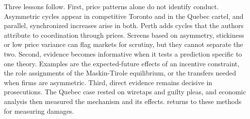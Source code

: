 Three lessons follow. First, price patterns alone do not identify conduct. Asymmetric cycles appear in competitive Toronto and in the
Quebec cartel, and parallel, synchronized increases arise in both. Perth adds cycles that the authors attribute to coordination through prices. Screens based on asymmetry, stickiness or low price variance
\citep{AbrantesMetzEtAl2006} can flag markets for scrutiny, but they cannot separate the two. Second, evidence becomes informative when
it tests a prediction specific to one theory. Examples are the expected-future effects of an incentive constraint, the role
assignments of the Maskin-Tirole equilibrium, or the transfers needed when firms are asymmetric. Third, direct evidence remains decisive
in prosecutions. The Quebec case rested on wiretaps and guilty pleas, and economic analysis then measured the mechanism and its
effects.  returns to these methods for measuring damages.
